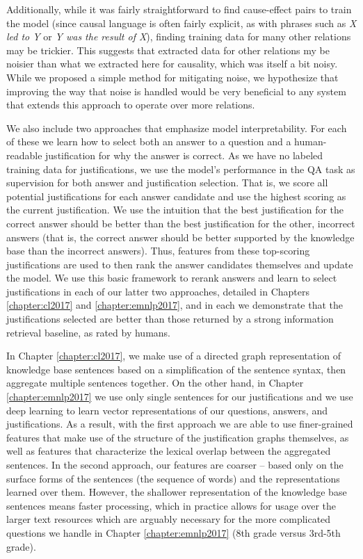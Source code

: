 Additionally, while it was fairly straightforward to find cause-effect pairs to train the model (since causal language is often fairly explicit, as with phrases such as \textit{X led to Y} or \textit{Y was the result of X}), finding training data for many other relations may be trickier.  This suggests that extracted data for other relations my be noisier than what we extracted here for causality, which was itself a bit noisy.  While we proposed a simple method for mitigating noise, we hypothesize that improving the way that noise is handled would be very beneficial to any system that extends this approach to operate over more relations.  

We also include two approaches that emphasize model interpretability.  For each of these we learn how to select both an answer to a question and a human-readable justification for why the answer is correct.  As we have no labeled training data for justifications, we use the model's performance in the QA task as supervision for both answer and justification selection.  That is, we score all potential justifications for each answer candidate and use the highest scoring as the current justification.  We use the intuition that the best justification for the correct answer should be better than the best justification for the other, incorrect answers (that is, the correct answer should be better supported by the knowledge base than the incorrect answers).  Thus, features from these top-scoring justifications are used to then rank the answer candidates themselves and update the model.  We use this basic framework to rerank answers and learn to select justifications in each of our latter two approaches, detailed in Chapters \ref{chapter:cl2017} and \ref{chapter:emnlp2017}, and in each we demonstrate that the justifications selected are better than those returned by a strong information retrieval baseline, as rated by humans. 
 
In Chapter \ref{chapter:cl2017}, we make use of a directed graph representation of knowledge base sentences based on a simplification of the sentence syntax, then aggregate multiple sentences together.  On the other hand, in Chapter \ref{chapter:emnlp2017} we use only single sentences for our justifications and we use deep learning to learn vector representations of our questions, answers, and justifications.  As a result, with the first approach we are able to use finer-grained features that make use of the structure of the justification graphs themselves, as well as features that characterize the lexical overlap between the aggregated sentences.   In the second approach, our features are coarser -- based only on the surface forms of the sentences (the sequence of words) and the representations learned over them.  However, the shallower representation of the knowledge base sentences means faster processing, which in practice allows for usage over the larger text resources which are arguably necessary for the more complicated questions we handle in Chapter \ref{chapter:emnlp2017} (8th grade versus 3rd-5th grade).        


